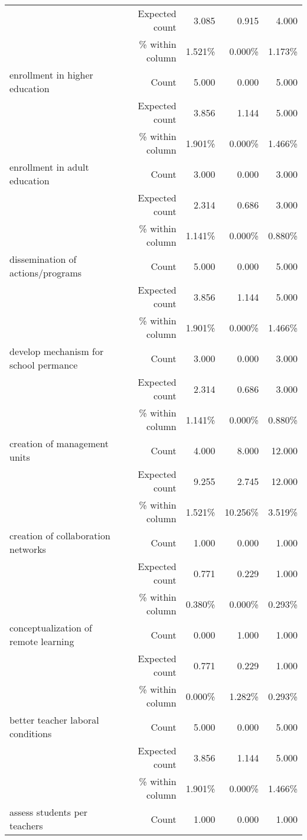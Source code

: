 \documentclass[6pt, oneside]{article}   	%
\begin{document}
\begin{table}[h]
{\begin{tabular}{lrrrr}
			 & Expected count & 3.085 & 0.915 & 4.000  \\
			 &  \% within column & 1.521\% & 0.000\% & 1.173\%  \\
			enrollment in higher education & Count & 5.000 & 0.000 & 5.000  \\
			 & Expected count & 3.856 & 1.144 & 5.000  \\
			 &  \% within column & 1.901\% & 0.000\% & 1.466\%  \\
			enrollment in adult education & Count & 3.000 & 0.000 & 3.000  \\
			 & Expected count & 2.314 & 0.686 & 3.000  \\
			 &  \% within column & 1.141\% & 0.000\% & 0.880\%  \\
			dissemination of actions/programs & Count & 5.000 & 0.000 & 5.000  \\
			 & Expected count & 3.856 & 1.144 & 5.000  \\
			 &  \% within column & 1.901\% & 0.000\% & 1.466\%  \\
			develop mechanism for school permance & Count & 3.000 & 0.000 & 3.000  \\
			 & Expected count & 2.314 & 0.686 & 3.000  \\
			 &  \% within column & 1.141\% & 0.000\% & 0.880\%  \\
			creation of management units & Count & 4.000 & 8.000 & 12.000  \\
			 & Expected count & 9.255 & 2.745 & 12.000  \\
			 &  \% within column & 1.521\% & 10.256\% & 3.519\%  \\
			creation of collaboration networks & Count & 1.000 & 0.000 & 1.000  \\
			 & Expected count & 0.771 & 0.229 & 1.000  \\
			 &  \% within column & 0.380\% & 0.000\% & 0.293\%  \\
			conceptualization of remote learning & Count & 0.000 & 1.000 & 1.000  \\
			 & Expected count & 0.771 & 0.229 & 1.000  \\
			 &  \% within column & 0.000\% & 1.282\% & 0.293\%  \\
			better teacher laboral conditions & Count & 5.000 & 0.000 & 5.000  \\
			 & Expected count & 3.856 & 1.144 & 5.000  \\
			 &  \% within column & 1.901\% & 0.000\% & 1.466\%  \\
			assess students per teachers & Count & 1.000 & 0.000 & 1.000  \\

\end{tabular}}
\end{table}
\end{document}
